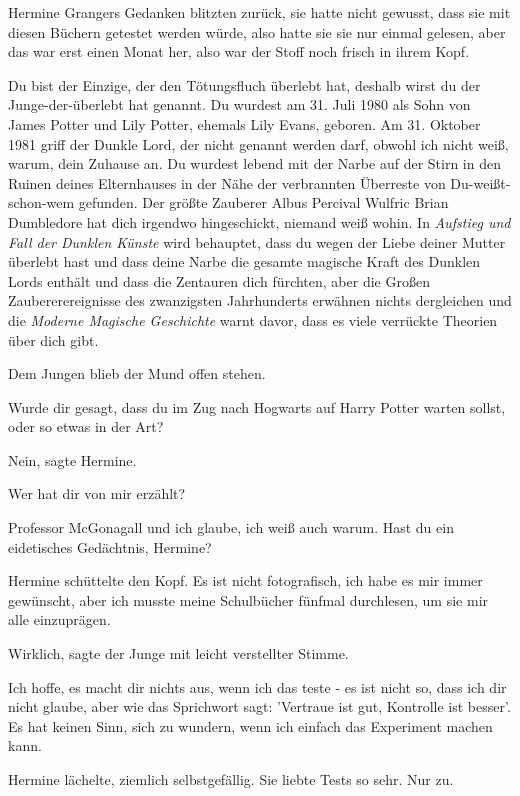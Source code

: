 Hermine Grangers Gedanken blitzten zurück, sie hatte nicht gewusst, dass sie mit
diesen Büchern getestet werden würde, also hatte sie sie nur einmal gelesen,
aber das war erst einen Monat her, also war der Stoff noch frisch in ihrem Kopf.

\glqq{}Du bist der Einzige, der den Tötungsfluch überlebt hat, deshalb wirst du
der Junge-der-überlebt hat genannt. Du wurdest am 31. Juli 1980 als Sohn von
James Potter und Lily Potter, ehemals Lily Evans, geboren. Am 31. Oktober 1981
griff der Dunkle Lord, der nicht genannt werden darf, obwohl ich nicht weiß,
warum, dein Zuhause an. Du wurdest lebend mit der Narbe auf der Stirn in den
Ruinen deines Elternhauses in der Nähe der verbrannten Überreste von
Du-weißt-schon-wem gefunden. Der größte Zauberer Albus Percival Wulfric Brian
Dumbledore hat dich irgendwo hingeschickt, niemand weiß wohin. In \emph{Aufstieg
und Fall der Dunklen Künste} wird behauptet, dass du wegen der Liebe deiner
Mutter überlebt hast und dass deine Narbe die gesamte magische Kraft des Dunklen
Lords enthält und dass die Zentauren dich fürchten, aber die Großen
Zaubererereignisse des zwanzigsten Jahrhunderts erwähnen nichts dergleichen und
die \emph{Moderne Magische Geschichte} warnt davor, dass es viele verrückte
Theorien über dich gibt.\grqq{}

Dem Jungen blieb der Mund offen stehen.

\glqq{}Wurde dir gesagt, dass du im Zug nach Hogwarts auf Harry Potter warten
sollst, oder so etwas in der Art?\grqq{}

\glqq{}Nein\grqq{}, sagte Hermine.

\glqq{}Wer hat dir von mir erzählt?\grqq{}

\glqq{}Professor McGonagall und ich glaube, ich weiß auch warum. Hast du ein
eidetisches Gedächtnis, Hermine?\grqq{}

Hermine schüttelte den Kopf. \glqq{}Es ist nicht fotografisch, ich habe es mir
immer gewünscht, aber ich musste meine Schulbücher fünfmal durchlesen, um sie
mir alle einzuprägen.\grqq{}

\glqq{}Wirklich\grqq{}, sagte der Junge mit leicht verstellter Stimme.

\glqq{}Ich hoffe, es macht dir nichts aus, wenn ich das teste - es ist nicht so,
dass ich dir nicht glaube, aber wie das Sprichwort sagt: 'Vertraue ist gut,
Kontrolle ist besser'. Es hat keinen Sinn, sich zu wundern, wenn ich einfach das
Experiment machen kann.\grqq{}

Hermine lächelte, ziemlich selbstgefällig. Sie liebte Tests so sehr. \glqq{}Nur
zu.\grqq{}

